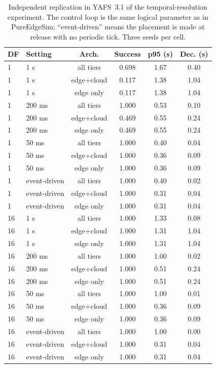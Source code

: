 \begin{table}[t]
\centering
\footnotesize
\caption{Independent replication in YAFS~3.1 of the temporal-resolution experiment. The control loop is the same logical parameter as in PureEdgeSim; ``event-driven'' means the placement is made at release with no periodic tick. Three seeds per cell.}
\label{tab:crosssim-replication}
\begin{tabular}{@{}llcccc@{}}
\toprule
DF & Setting & Arch. & Success & p95 (s) & Dec. (s)\\
\midrule
1 & 1 s & all tiers & 0.698 & 1.67 & 0.40\\
1 & 1 s & edge+cloud & 0.117 & 1.38 & 1.04\\
1 & 1 s & edge only & 0.117 & 1.38 & 1.04\\
1 & 200 ms & all tiers & 1.000 & 0.53 & 0.10\\
1 & 200 ms & edge+cloud & 0.469 & 0.55 & 0.24\\
1 & 200 ms & edge only & 0.469 & 0.55 & 0.24\\
1 & 50 ms & all tiers & 1.000 & 0.40 & 0.04\\
1 & 50 ms & edge+cloud & 1.000 & 0.36 & 0.09\\
1 & 50 ms & edge only & 1.000 & 0.36 & 0.09\\
1 & event-driven & all tiers & 1.000 & 0.40 & 0.02\\
1 & event-driven & edge+cloud & 1.000 & 0.31 & 0.04\\
1 & event-driven & edge only & 1.000 & 0.31 & 0.04\\
16 & 1 s & all tiers & 1.000 & 1.33 & 0.08\\
16 & 1 s & edge+cloud & 1.000 & 1.31 & 1.04\\
16 & 1 s & edge only & 1.000 & 1.31 & 1.04\\
16 & 200 ms & all tiers & 1.000 & 1.00 & 0.02\\
16 & 200 ms & edge+cloud & 1.000 & 0.51 & 0.24\\
16 & 200 ms & edge only & 1.000 & 0.51 & 0.24\\
16 & 50 ms & all tiers & 1.000 & 1.00 & 0.01\\
16 & 50 ms & edge+cloud & 1.000 & 0.36 & 0.09\\
16 & 50 ms & edge only & 1.000 & 0.36 & 0.09\\
16 & event-driven & all tiers & 1.000 & 1.00 & 0.00\\
16 & event-driven & edge+cloud & 1.000 & 0.31 & 0.04\\
16 & event-driven & edge only & 1.000 & 0.31 & 0.04\\
\bottomrule
\end{tabular}
\end{table}

